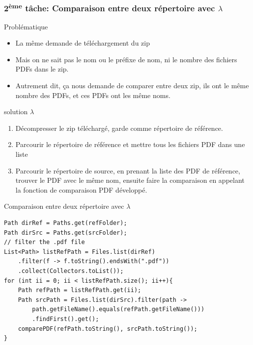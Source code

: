 \documentclass{beamer}
\begin{document}
        \begin{frame}
            \frametitle{2\textsuperscript{ème} tâche: Comparaison entre deux répertoire avec $\lambda$}
            \begin{block}{Problématique}
                \begin{itemize}
                    \item La même demande de téléchargement du zip
                    \item Mais on ne sait pas le nom ou le préfixe de nom, ni le nombre des fichiers PDFs dans le zip.
                    \item Autrement dit, ça nous demande de comparer entre deux zip, ils ont le même nombre des PDFs, et ces PDFs ont les même noms.
                \end{itemize}
            \end{block}
            
            \pause
            \begin{block}{solution $\lambda$}
                \begin{enumerate}
                    \item Décompresser le zip téléchargé, garde comme répertoire de référence.
                    \item Parcourir le répertoire de référence et mettre tous les fichiers PDF dans une liste
                    \item Parcourir le répertoire de source, en prenant la liste des PDF de référence, trouver le PDF avec le même nom, ensuite faire la comparaison en appelant la fonction de comparaison PDF développé.
                \end{enumerate}
            \end{block}
        \end{frame}
        
        \begin{frame}[fragile] %
            \begin{block}{Comparaison entre deux répertoire avec $\lambda$}
            \begin{lstlisting}
Path dirRef = Paths.get(refFolder);
Path dirSrc = Paths.get(srcFolder);
// filter the .pdf file
List<Path> listRefPath = Files.list(dirRef)
	.filter(f -> f.toString().endsWith(".pdf"))
	.collect(Collectors.toList());
for (int ii = 0; ii < listRefPath.size(); ii++){
	Path refPath = listRefPath.get(ii);
	Path srcPath = Files.list(dirSrc).filter(path ->
	    path.getFileName().equals(refPath.getFileName()))
	    .findFirst().get();
	comparePDF(refPath.toString(), srcPath.toString());
}
            \end{lstlisting}
            \end{block}
        \end{frame}
        
\end{document}
